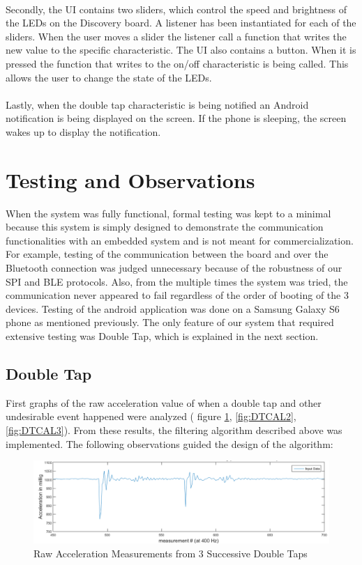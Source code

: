 \documentclass[12pt]{article}
\begin{document}
\paragraph{}
Secondly, the UI contains two sliders, which control the speed and brightness of the LEDs on the Discovery board. A listener has been instantiated for each of the sliders. When the user moves a slider the listener call a function that writes the new value to the specific characteristic. The UI also contains a button. When it is pressed the function that writes to the on/off characteristic is being called. This allows the user to change the state of the LEDs.
\paragraph{}
Lastly, when the double tap characteristic is being notified an Android notification is being displayed on the screen. If the phone is sleeping, the screen wakes up to display the notification.


\section{Testing and Observations}
When the system was fully functional, formal testing was kept to a minimal because this system is simply designed to demonstrate the communication functionalities with an embedded system and is not meant for commercialization. For example, testing of the communication between the board and over the Bluetooth connection was judged unnecessary because of the robustness of our SPI and BLE protocols. Also, from the multiple times the system was tried, the communication never appeared to fail regardless of the order of booting of the 3 devices. Testing of the android application was done on a Samsung Galaxy S6 phone as mentioned previously. The only feature of our system that required extensive testing was Double Tap, which is explained in the next section. 
\subsection{Double Tap}
First graphs of the raw acceleration value of when a double tap and other undesirable event happened were analyzed ( figure \ref{fig:DTCAL1}, \ref{fig:DTCAL2}, \ref{fig:DTCAL3}). From these results, the filtering algorithm described above was implemented. The following observations guided the design of the algorithm:

\begin{figure}[!htb]
 \centering
 \includegraphics[scale=0.45]{images/DTcalibration1.png}
 \caption{Raw Acceleration Measurements from 3 Successive Double Taps}
 \label{fig:DTCAL1}
\end{figure}
\end{document}
